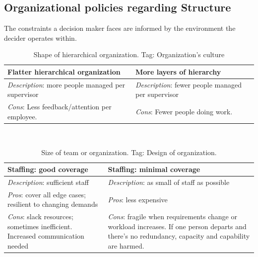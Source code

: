 \subsection{Organizational policies regarding Structure}

The constraints a decision maker faces are informed by the environment the decider operates within. 

\begin{center}
\begin{table}[ht]
\begin{tabular}{ | m{\dilemmatablewidth}| m{\dilemmatablewidth} | } 
  \hline
  \textbf{Flatter hierarchical organization} &
  \textbf{More layers of hierarchy} \\ 
  \hline
  \textit{Description}: more people managed per supervisor & 
  \textit{Description}: fewer people managed per supervisor \\ 
  \hline
  \textit{Cons}: Less feedback/attention per employee. & 
  \textit{Cons}: Fewer people doing work. \\  
  \hline
\end{tabular}
\caption{Shape of hierarchical organization.
{\tiny Tag: Organization's culture}
}
\end{table}
\end{center}

\ \\

\begin{center}
\begin{table}[ht]
\begin{tabular}{ | m{\dilemmatablewidth}| m{\dilemmatablewidth} | } 
  \hline
  \textbf{Staffing: good coverage} &
  \textbf{Staffing: minimal coverage} \\
  \hline
  \textit{Description}: sufficient staff &
  \textit{Description}: as small of staff as possible \\  
  \hline
  \textit{Pros}: cover all edge cases; resilient to changing demands &
  \textit{Pros}: less expensive \\
  \hline
  \textit{Cons}: slack resources; sometimes inefficient. Increased communication needed & 
  \textit{Cons}: fragile when requirements change or workload increases. If one person departs and there's no redundancy, capacity and capability are harmed.  \\
  \hline
\end{tabular}
\caption{Size of team or organization.
{\tiny Tag: Design of organization.}
}
\label{table:staff_many-vs-few}
\end{table}
\end{center}


